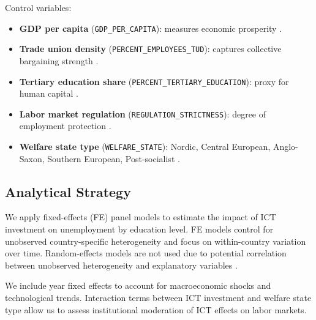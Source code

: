 Control variables:
\begin{itemize}
  \item \textbf{GDP per capita} (\texttt{GDP\_PER\_CAPITA}): measures economic prosperity 
  \parencite{oecd2022gdp}.
  \item \textbf{Trade union density} (\texttt{PERCENT\_EMPLOYEES\_TUD}): captures collective 
  bargaining strength \parencite{oecd2022tud}.
  \item \textbf{Tertiary education share} (\texttt{PERCENT\_TERTIARY\_EDUCATION}): proxy for 
  human capital \parencite{oecd2022education}.
  \item \textbf{Labor market regulation} (\texttt{REGULATION\_STRICTNESS}): degree of employment 
  protection \parencite{oecd2022regulation}.
  \item \textbf{Welfare state type} (\texttt{WELFARE\_STATE}): Nordic, Central European, 
  Anglo-Saxon, Southern European, Post-socialist \parencite{espingandersen1990thethree}.
\end{itemize}

\subsection{Analytical Strategy}

We apply fixed-effects (FE) panel models to estimate the impact of ICT investment on unemployment 
by education level. FE models control for unobserved country-specific heterogeneity and focus on 
within-country variation over time. Random-effects models are not used due to potential 
correlation between unobserved heterogeneity and explanatory variables 
\parencite{wooldridge2010econometric}.

We include year fixed effects to account for macroeconomic shocks and technological trends. 
Interaction terms between ICT investment and welfare state type allow us to assess institutional 
moderation of ICT effects on labor markets.
